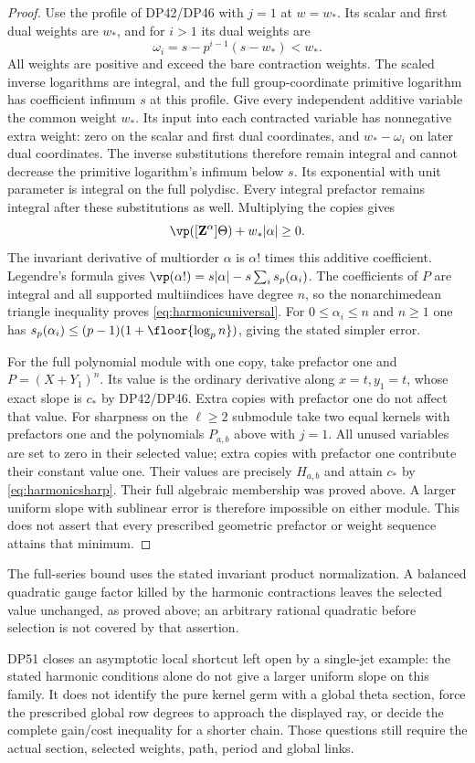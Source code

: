 \begin{proof}
Use the profile of DP42/DP46 with $j=1$ at $w=w_*$.
Its scalar and first dual weights are $w_*$, and for $i>1$ its dual weights are
\[
 \omega_i=s-p^{i-1}(s-w_*)<w_*.
\]
All weights are positive and exceed the bare contraction weights.
The scaled inverse logarithms are integral, and the full group-coordinate primitive logarithm has coefficient infimum $s$ at this profile.
Give every independent additive variable the common weight $w_*$.
Its input into each contracted variable has nonnegative extra weight: zero on the scalar and first dual coordinates, and $w_*-\omega_i$ on later dual coordinates.
The inverse substitutions therefore remain integral and cannot decrease the primitive logarithm's infimum below $s$.
Its exponential with unit parameter is integral on the full polydisc.
Every integral prefactor remains integral after these substitutions as well.
Multiplying the copies gives
\[
 \vp([\mathbf Z^\alpha]\Theta)+w_*|\alpha|\ge0.
\]
The invariant derivative of multiorder $\alpha$ is $\alpha!$ times this additive coefficient.
Legendre's formula gives
$\vp(\alpha!)=s|\alpha|-s\sum_i s_p(\alpha_i)$.
The coefficients of $P$ are integral and all supported multiindices have degree $n$, so the nonarchimedean triangle inequality proves \eqref{eq:harmonicuniversal}.
For $0\le\alpha_i\le n$ and $n\ge1$ one has
$s_p(\alpha_i)\le(p-1)(1+\floor{\log_p n})$, giving the stated simpler error.

For the full polynomial module with one copy, take prefactor one and $P=(X+Y_1)^n$.
Its value is the ordinary derivative along $x=t,y_1=t$, whose exact slope is $c_*$ by DP42/DP46.
Extra copies with prefactor one do not affect that value.
For sharpness on the $\ell\ge2$  submodule take two equal kernels with prefactors one and the polynomials $P_{a,b}$ above with $j=1$.
All unused variables are set to zero in their selected value; extra copies with prefactor one contribute their constant value one.
Their values are precisely $H_{a,b}$ and attain $c_*$ by \eqref{eq:harmonicsharp}.
Their full algebraic  membership was proved above.
A larger uniform slope with sublinear error is therefore impossible on either module.
This does not assert that every prescribed geometric prefactor or weight sequence attains that minimum.
\end{proof}

The full-series bound uses the stated invariant product normalization.
A balanced quadratic gauge factor killed by the harmonic contractions leaves the selected value unchanged, as proved above; an arbitrary rational quadratic before selection is not covered by that assertion.

DP51 closes an asymptotic local shortcut left open by a single-jet example:
the stated harmonic conditions alone do not give a larger uniform slope on this family.
It does not identify the pure kernel germ with a global theta section, force the prescribed global row degrees to approach the displayed ray, or decide the complete gain/cost inequality for a shorter chain.
Those questions still require the actual section, selected weights, path, period and global links.

